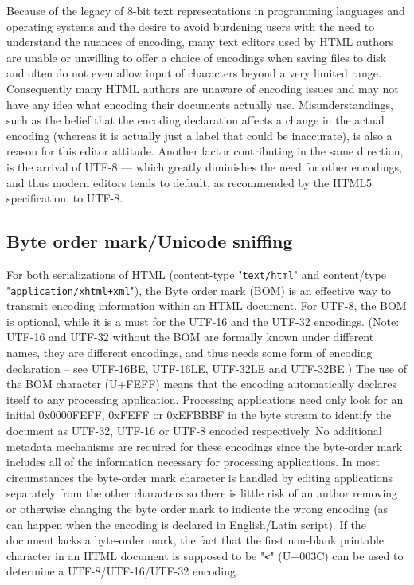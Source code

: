 Because of the legacy of 8-bit text representations in programming languages and operating systems and the desire to avoid burdening users with the need to understand the nuances of encoding, many text editors used by HTML authors are unable or unwilling to offer a choice of encodings when saving files to disk and often do not even allow input of characters beyond a very limited range. Consequently many HTML authors are unaware of encoding issues and may not have any idea what encoding their documents actually use. Misunderstandings, such as the belief that the encoding declaration affects a change in the actual encoding (whereas it is actually just a label that could be inaccurate), is also a reason for this editor attitude. Another factor contributing in the same direction, is the arrival of UTF-8 — which greatly diminishes the need for other encodings, and thus modern editors tends to default, as recommended by the HTML5 specification, to UTF-8.







\subsection{Byte order mark/Unicode sniffing}

For both serializations of HTML (content-type "\texttt{text/html}" and content/type "\texttt{application/xhtml+xml}"), the Byte order mark (BOM) is an effective way to transmit encoding information within an HTML document. For UTF-8, the BOM is optional, while it is a must for the UTF-16 and the UTF-32 encodings. (Note: UTF-16 and UTF-32 without the BOM are formally known under different names, they are different encodings, and thus needs some form of encoding declaration – see UTF-16BE, UTF-16LE, UTF-32LE and UTF-32BE.) The use of the BOM character (U+FEFF) means that the encoding automatically declares itself to any processing application. Processing applications need only look for an initial 0x0000FEFF, 0xFEFF or 0xEFBBBF in the byte stream to identify the document as UTF-32, UTF-16 or UTF-8 encoded respectively. No additional metadata mechanisms are required for these encodings since the byte-order mark includes all of the information necessary for processing applications. In most circumstances the byte-order mark character is handled by editing applications separately from the other characters so there is little risk of an author removing or otherwise changing the byte order mark to indicate the wrong encoding (as can happen when the encoding is declared in English/Latin script). If the document lacks a byte-order mark, the fact that the first non-blank printable character in an HTML document is supposed to be "\texttt{<}" (U+003C) can be used to determine a UTF-8/UTF-16/UTF-32 encoding.





